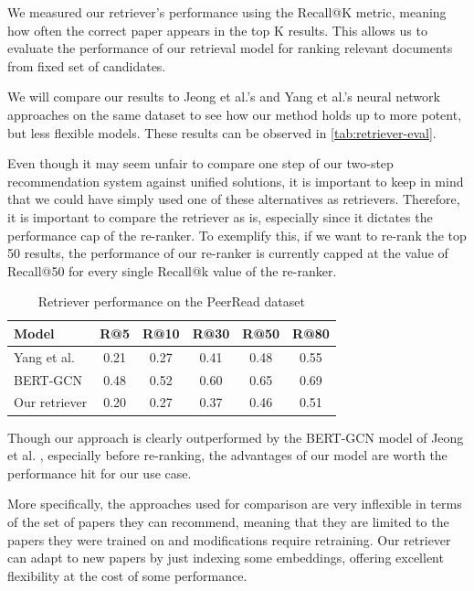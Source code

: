 \documentclass[12pt,a4paper]{report}
\begin{document}
We measured our retriever's performance using the Recall@K metric, meaning how often the correct paper appears in the top K results. This allows us to evaluate the performance of our retrieval model for ranking relevant documents from fixed set of candidates.

We will compare our results to Jeong et al.'s \cite{Jeong2019ACC} and Yang et al.'s \cite{Yang2018ALB} neural network approaches on the same dataset to see how our method holds up to more potent, but less flexible models. These results can be observed in \autoref{tab:retriever-eval}.

Even though it may seem unfair to compare one step of our two-step recommendation system against unified solutions, it is important to keep in mind that we could have simply used one of these alternatives as retrievers. Therefore, it is important to compare the retriever as is, especially since it dictates the performance cap of the re-ranker. To exemplify this, if we want to re-rank the top 50 results, the performance of our re-ranker is currently capped at the value of Recall@50 for every single Recall@k value of the re-ranker. 

\begin{table}[th]
\centering
\small
\setlength{\tabcolsep}{12pt}
\renewcommand{\arraystretch}{1.2}
\begin{tabular}{lccccc}
\toprule
\textbf{Model} & \textbf{R@5} & \textbf{R@10} & \textbf{R@30} & \textbf{R@50} & \textbf{R@80} \\
\midrule
Yang et al. \cite{Yang2018ALB} & 0.21 & 0.27 & 0.41 & 0.48  & 0.55 \\
BERT-GCN \cite{Jeong2019ACC} & 0.48 & 0.52 & 0.60 & 0.65 & 0.69 \\
Our retriever & 0.20 & 0.27 & 0.37 & 0.46 & 0.51 \\
    \bottomrule
\end{tabular}
\caption{Retriever performance on the PeerRead dataset}
\label{tab:retriever-eval}
\end{table}

Though our approach is clearly outperformed by the BERT-GCN model of Jeong et al. \cite{Jeong2019ACC}, especially before re-ranking, the advantages of our model are worth the performance hit for our use case.

More specifically, the approaches used for comparison are very inflexible in terms of the set of papers they can recommend, meaning that they are limited to the papers they were trained on and modifications require retraining. Our retriever can adapt to new papers by just indexing some embeddings, offering excellent flexibility at the cost of some performance.
\end{document}
